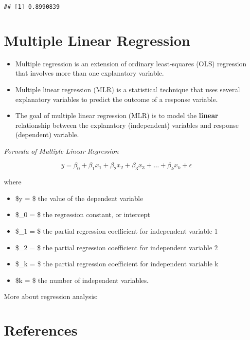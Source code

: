 \documentclass[]{book}
\providecommand{\tightlist}{%
  \setlength{\itemsep}{0pt}\setlength{\parskip}{0pt}}
\begin{document}
\begin{verbatim}
## [1] 0.8990839
\end{verbatim}

\hypertarget{multiple-linear-regression}{%
\section{Multiple Linear Regression}\label{multiple-linear-regression}}

\begin{itemize}
\tightlist
\item
  Multiple regression is an extension of ordinary least-squares (OLS) regression that involves more than one explanatory variable.
\item
  Multiple linear regression (MLR) is a statistical technique that uses several explanatory variables to predict the outcome of a response variable.
\item
  The goal of multiple linear regression (MLR) is to model the \textbf{linear} relationship between the explanatory (independent) variables and response (dependent) variable.
\end{itemize}

\emph{Formula of Multiple Linear Regression}

\[y=\beta_0+\beta_1 x_1+\beta_2 x_2+\beta_3 x_3+ \dots + \beta_k x_k+ \epsilon\]

where

\begin{itemize}
\tightlist
\item
  \$y = \$ the value of the dependent variable
\item
  \$\beta\_0 = \$ the regression constant, or intercept
\item
  \$\beta\_1 = \$ the partial regression coefficient for independent variable 1
\item
  \$\beta\_2 = \$ the partial regression coefficient for independent variable 2
\item
  \$\beta\_k = \$ the partial regression coefficient for independent variable k
\item
  \$k = \$ the number of independent variables.
\end{itemize}

More about regression analysis:

\hypertarget{references-8}{%
\section*{References}\label{references-8}}
\end{document}
